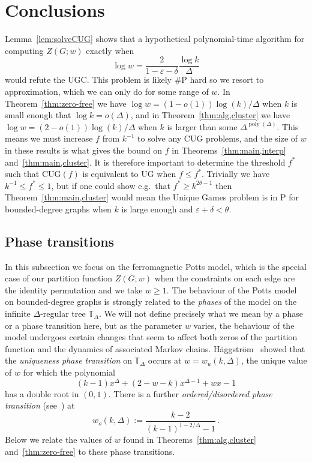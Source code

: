\documentclass[10pt,a4paper]{article}
\theoremstyle{definition}
\DeclareMathOperator{\poly}{poly}
\newcommand*{\TT}[1][]{\mathbb{T}_{#1}}
\newcommand*{\eps}{\varepsilon}
\newcommand*{\CUG}[1][]{CUG$(#1)$}
\begin{document}
\section{Conclusions}\label{sec:conc}
%
Lemma~\ref{lem:solveCUG} shows that a hypothetical polynomial-time algorithm for computing $Z(G;w)$ exactly when 
\[
\log w = \frac{2}{1-\eps-\delta}\frac{\log k}{\Delta}
\]
would refute the UGC. 
This problem is likely \#P hard so we resort to approximation, which we can only do for some range of $w$.
In Theorem~\ref{thm:zero-free} we have $\log w = (1-o(1))\log(k)/\Delta$ when $k$ is small enough that $\log k=o(\Delta)$, and in Theorem~\ref{thm:alg,cluster} we have $\log w = (2-o(1))\log(k)/\Delta$ when $k$ is larger than some $\Delta^{\poly(\Delta)}$. 
This means we must increase $f$ from $k^{-1}$ to solve any CUG problems, and the size of $w$ in these results is what gives the bound on $f$ in Theorems~\ref{thm:main,interp} and~\ref{thm:main,cluster}.
It is therefore important to determine the threshold $f^*$ such that \CUG[f] is equivalent to UG when $f\le f^*$. 
Trivially we have $k^{-1}\le f^*\le 1$, but if one could show e.g.\ that $f^*\ge k^{2\theta-1}$ then Theorem~\ref{thm:main,cluster} would mean the Unique Games problem is in P for bounded-degree graphs when $k$ is large enough and $\eps+\delta < \theta$.
%
%
\subsection{Phase transitions}
%
In this subsection we focus on the ferromagnetic Potts model, which is the special case of our partition function $Z(G;w)$ when the constraints on each edge are the identity permutation and we take $w\ge 1$.
The behaviour of the Potts model on bounded-degree graphs is strongly related to the \emph{phases} of the model on the infinite $\Delta$-regular tree $\TT[\Delta]$. 
We will not define precisely what we mean by a phase or a phase transition here, but as the parameter $w$ varies, the behaviour of the model undergoes certain changes that seem to affect both zeros of the partition function and the dynamics of associated Markov chains.
Häggström~\cite{Haggstrom96} showed that the \emph{uniqueness phase transition} on $\TT[\Delta]$ occurs at $w=w_u(k,\Delta)$, the unique value of $w$ for which the polynomial 
\begin{equation}\label{eq:def,wu}
(k-1)x^\Delta + (2-w-k)x^{\Delta-1}+wx-1
\end{equation}
has a double root in $(0,1)$. 
There is a further \emph{ordered/disordered phase transition} (see~\cite{GSVY16}) at 
\[
w_o(k,\Delta):=\frac{k-2}{(k-1)^{1-2/\Delta}-1}\,.
\]
Below we relate the values of $w$ found in Theorems~\ref{thm:alg,cluster} and~\ref{thm:zero-free} to these phase transitions.
%
\end{document}
